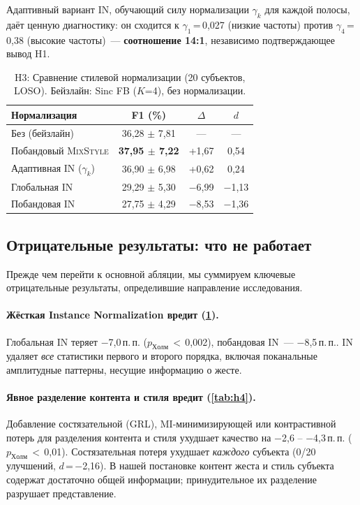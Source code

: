 \documentclass[conference]{IEEEtran}
\newcommand{\pp}{\,п.\,п.}
\newcommand{\mixstyle}{\textsc{MixStyle}}
\begin{document}
Адаптивный вариант IN, обучающий силу нормализации $\gamma_k$ для каждой полосы, даёт ценную диагностику: он сходится к $\gamma_1$\,=\,0,027 (низкие частоты) против $\gamma_4$\,=\,0,38 (высокие частоты)~--- \textbf{соотношение 14:1}, независимо подтверждающее вывод H1.

\begin{table}[t]
\centering
\caption{H3: Сравнение стилевой нормализации (20 субъектов, LOSO). Бейзлайн: Sinc FB ($K$=4), без нормализации.}
\label{tab:h3}
\begin{tabular}{lccc}
\toprule
Нормализация & F1 (\%) & $\Delta$ & $d$ \\
\midrule
Без (бейзлайн) & 36,28 $\pm$ 7,81 & --- & --- \\
Побандовый \mixstyle{} & \textbf{37,95 $\pm$ 7,22} & +1,67 & 0,54 \\
Адаптивная IN ($\gamma_k$) & 36,90 $\pm$ 6,98 & +0,62 & 0,24 \\
Глобальная IN & 29,29 $\pm$ 5,30 & $-$6,99 & $-$1,13 \\
Побандовая IN & 27,75 $\pm$ 4,29 & $-$8,53 & $-$1,36 \\
\bottomrule
\end{tabular}
\end{table}

\subsection{Отрицательные результаты: что не работает}
\label{sec:negative}

Прежде чем перейти к основной абляции, мы суммируем ключевые отрицательные результаты, определившие направление исследования.

\paragraph{Жёсткая Instance Normalization вредит (\cref{tab:h3}).}
Глобальная IN теряет $-$7,0\pp{} ($p_{\mathrm{Холм}}$\,$<$\,0,002), побандовая IN~--- $-$8,5\pp{}.
IN удаляет \emph{все} статистики первого и второго порядка, включая поканальные амплитудные паттерны, несущие информацию о жесте.

\paragraph{Явное разделение контента и стиля вредит (\cref{tab:h4}).}
Добавление состязательной (GRL), MI-минимизирующей или контрастивной потерь для разделения контента и стиля ухудшает качество на $-$2,6 -- $-$4,3\pp{} ($p_{\mathrm{Холм}}$\,$<$\,0,01).
Состязательная потеря ухудшает \emph{каждого} субъекта (0/20 улучшений, $d$\,=\,$-$2,16).
В нашей постановке контент жеста и стиль субъекта содержат достаточно общей информации; принудительное их разделение разрушает представление.
\end{document}
